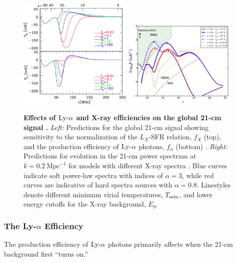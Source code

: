 \begin{figure}[]
\begin{center}
\includegraphics[width=0.49\textwidth]{Mirocha/pritchard2012_fafX.pdf}
\includegraphics[width=0.49\textwidth]{Mirocha/pacucci2014_fig5.pdf}
\end{center}
\caption{{\bf Effects of $\text{Ly-}\alpha$ and X-ray efficiencies on the global 21-cm signal \cite{Pritchard2010,Pacucci2014}.} \textit{Left:} Predictions for the global 21-cm signal showing sensitivity to the normalization of the $L_X$-SFR relation, $f_X$ (top), and the production efficiency of $\text{Ly-}\alpha$ photons, $f_{\alpha}$ (bottom) \cite{Pritchard2010}. \textit{Right:} Predictions for evolution in the 21-cm power spectrum at $k=0.2 \ \mathrm{Mpc}^{-1}$ for models with different X-ray spectra \cite{Pacucci2014}. Blue curves indicate soft power-law spectra with indices of $\alpha=3$, while red curves are indicative of hard spectra sources with $\alpha=0.8$. Linestyles denote different minimum virial temperatures, $T_{\min}$, and lower energy cutoffs for the X-ray background, $E_0$.}
\label{fig:p12_fafX}
\end{figure}



\subsubsection{The Ly-$\alpha$ Efficiency}
The production efficiency of $\text{Ly-}\alpha$ photons primarily affects when the 21-cm background first ``turns on.'' 

